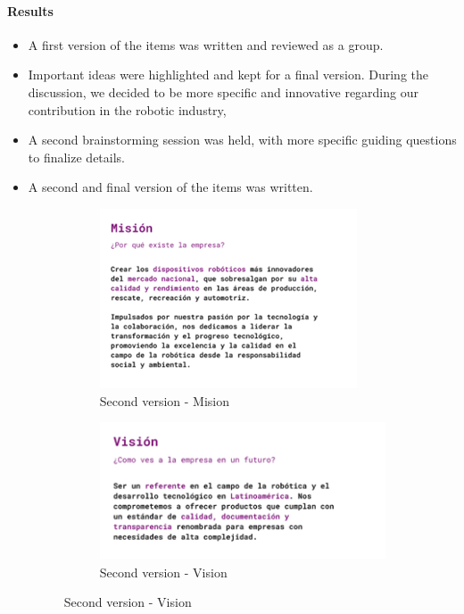 \documentclass{article}
\begin{document}
\paragraph{Results}
\begin{itemize}
    \item A first version of the items was written and reviewed as a group. 
    \item Important ideas were highlighted and kept for a final version. During the discussion, we decided to be more specific and innovative regarding our contribution in the robotic industry,
    \item A second brainstorming session was held, with more specific guiding questions to finalize details.
    \item A second and final version of the items was written.
    
    \begin{figure}[H]
        \centering
        \begin{subfigure}[b]{0.475\textwidth}
            \centering
            \includegraphics[width=\textwidth]{Images/Design/MisionV2.png}
            \caption[Second version - Mision]%
            {{\small Second version - Mision}}    
            
        \end{subfigure}
        \hfill
        \begin{subfigure}[b]{0.475\textwidth}  
            \centering 
            \includegraphics[width=\textwidth]{Images/Design/VisionV2.png}
            \caption[]%
            {{\small Second version - Vision}}    
            

\end{subfigure}
\end{figure}
\end{itemize}
\end{document}
